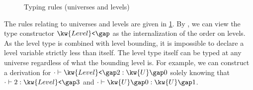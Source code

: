 \documentclass[a4paper,UKenglish,cleveref,autoref,thm-restate]{lipics-v2021}
\begin{document}
\begin{figure}
\caption{Typing rules (universes and levels)}
\label{fig:typing:univ}
\end{figure}

The rules relating to universes and levels are given in \cref{fig:typing:univ}.
By , we can view the type constructor $ \kw{Level}\texttt{<} \gap   \relax  $
as the internalization of the order on levels.
As the level type is combined with level bounding,
it is impossible to declare a level variable strictly less than itself.
The level type itself can be typed at any universe
regardless of what the bounding level is.
For example, we can construct a derivation for $  \cdot   \vdash   \kw{Level}\texttt{<} \gap   2    \mathrel{:}   \kw{U} \gap   0   $
solely knowing that $  \cdot   \vdash   2   \mathrel{:}   \kw{Level}\texttt{<} \gap   3   $ and $  \cdot   \vdash   \kw{U} \gap   0    \mathrel{:}   \kw{U} \gap   1   $.
\end{document}
